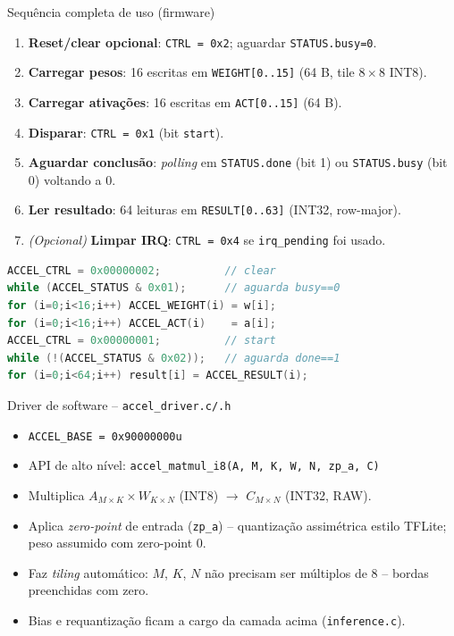 \documentclass[aspectratio=169,10pt]{beamer}
\begin{document}
\begin{frame}[fragile]{Sequência completa de uso (firmware)}
  \small
  \begin{enumerate}
    \item \textbf{Reset/clear opcional}: \texttt{CTRL = 0x2}; aguardar \texttt{STATUS.busy=0}.
    \item \textbf{Carregar pesos}: 16 escritas em \texttt{WEIGHT[0..15]} (64 B, tile $8\times8$ INT8).
    \item \textbf{Carregar ativações}: 16 escritas em \texttt{ACT[0..15]} (64 B).
    \item \textbf{Disparar}: \texttt{CTRL = 0x1} (bit \texttt{start}).
    \item \textbf{Aguardar conclusão}: \emph{polling} em \texttt{STATUS.done}
      (bit 1) ou \texttt{STATUS.busy} (bit 0) voltando a 0.
    \item \textbf{Ler resultado}: 64 leituras em \texttt{RESULT[0..63]} (INT32, row-major).
    \item \textit{(Opcional)} \textbf{Limpar IRQ}: \texttt{CTRL = 0x4} se \texttt{irq\_pending} foi usado.
  \end{enumerate}

  \vspace{0.5em}
  \begin{lstlisting}[language=C]
ACCEL_CTRL = 0x00000002;          // clear
while (ACCEL_STATUS & 0x01);      // aguarda busy==0
for (i=0;i<16;i++) ACCEL_WEIGHT(i) = w[i];
for (i=0;i<16;i++) ACCEL_ACT(i)    = a[i];
ACCEL_CTRL = 0x00000001;          // start
while (!(ACCEL_STATUS & 0x02));   // aguarda done==1
for (i=0;i<64;i++) result[i] = ACCEL_RESULT(i);
  \end{lstlisting}
\end{frame}

\begin{frame}{Driver de software -- \texttt{accel\_driver.c/.h}}
  \begin{itemize}
    \item \texttt{ACCEL\_BASE = 0x90000000u}
    \item API de alto nível: \texttt{accel\_matmul\_i8(A, M, K, W, N, zp\_a, C)}
    \item Multiplica $A_{M\times K} \times W_{K\times N}$ (INT8) $\to$ $C_{M\times N}$ (INT32, RAW).
    \item Aplica \emph{zero-point} de entrada (\texttt{zp\_a}) -- quantização assimétrica
      estilo TFLite; peso assumido com zero-point 0.
    \item Faz \emph{tiling} automático: $M$, $K$, $N$ não precisam ser múltiplos de 8
      -- bordas preenchidas com zero.
    \item Bias e requantização ficam a cargo da camada acima (\texttt{inference.c}).
  \end{itemize}
\end{frame}
\end{document}
